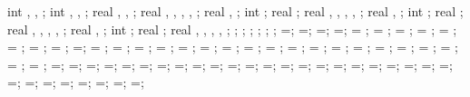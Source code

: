 {{int \showleftpinsup, \showrightpinsup, \showbottompinsup;
int \nbotpin, \ibot, \ijkk;
real \botpinx, \botpinspace, \bottomlength;
real \lefttriw, \leftlinew, \leftlined, \leftlinet, \leftradratio;
real \leftxvalue, \leftyvalue;
int \leftshowcircle;
real \leftrotpin;
real \righttriw, \rightlinew, \rightlined, \rightlinet, \rightradratio;
real \rightxvalue, \rightyvalue;
int \rightshowcircle;
real \rightrotpin;
real \bottomtriw, \bottomlinew, \bottomlined, \bottomlinet, \bottomradratio;
real \bottomxvalue, \bottomyvalue;
int \bottomshowcircle;
real \bottomrotpin;
real \hsdistleft, \hsdistright, \hsdistbottom, \hsinnerlinethk, \thinlinethk;
\hsdistleft=0.0cm;
\hsdistright=0.0cm;
\hsdistbottom=0.0cm;
\hsinnerlinethk=0pt;
\thinlinethk=0.5pt;
;
\hsdistleft=\hsdistleft;
\hsdistright=\hsdistright;
\hsdistbottom=\hsdistbottom;
\hsinnerlinethk=\hsinnerlinethk;
\storyheight = \storyheight;
\baywidth = \baywidth;
\startx = \startx;
\starty = \starty;
\supportwidth = \supportwidth;
\supportheight = \supportheight;
\isolationwidth = \isolationwidth;
\isolationdepth = \isolationdepth;
\isoshift=\isoshift;
\foundationdepth = \foundationdepth;
\linet = \linet;
\beamlinet = \beamlinet;
\collinet = \collinet;
\baselinet = \baselinet;
\isolinet = \isolinet;
\massrad = \massrad;
\foundsidew = \foundsidew;
\leftsoildist = \leftsoildist;
\rightsoildist = \rightsoildist;
\leftsoildepth = \leftsoildepth;
\rightsoildepth = \rightsoildepth;
\soilbelowfound = \soilbelowfound;
\leftcontrolx = \leftcontrolx;
\leftcontroly = \leftcontroly;
\rightcontrolx = \rightcontrolx;
\rightcontroly = \rightcontroly;
\axeslenX = \axeslenX;
\axeslenY = \axeslenY;
\piledepth=\piledepth;
\pilesidespace=\pilesidespace;
\pilediameter=\pilediameter;
\pilelinethickness=\pilelinethickness;
\pblinet=\pblinet;
\latloadshift=\latloadshift;
\toparrlen=\toparrlen;
\basearrlen=\basearrlen;
\drift=\drift;
=;
=;
=;
\engbedrockdepth=\engbedrockdepth;
\engbedrockleftdist=\engbedrockleftdist;
\engbedrockrightdist=\engbedrockrightdist;
\engbedrocklinewidth=\engbedrocklinewidth;
\translayerlinet=\translayerlinet;
\ssinterlinet=\ssinterlinet;
\markssexspace=\markssexspace;
\markssrad=\markssrad;
\marksslinet=\marksslinet;
\supershadespace=\supershadespace;
\shearwalllinet=\shearwalllinet;
\marksuperexspace=\marksuperexspace;
\marksuperrad=\marksuperrad;
\marksuperlinet=\marksuperlinet;
\phorspbtwspr=\phorspbtwspr;
\phorspringspace=\phorspringspace;
\phortextshiftx=\phortextshiftx;
\phortextshifty=\phortextshifty;
\phorsegm=\phorsegm;
}}

